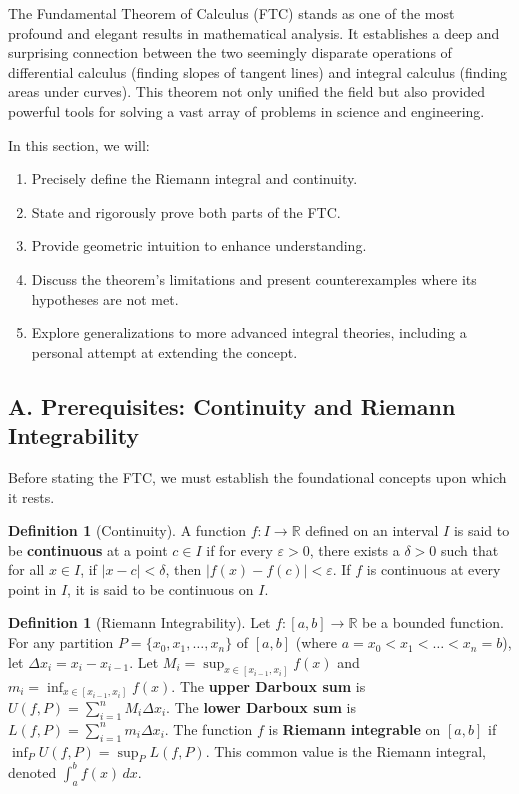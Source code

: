\documentclass[11pt, a4paper]{article}
\theoremstyle{plain} %
\theoremstyle{definition} %
\newtheorem{definition}[theorem]{Definition}
\theoremstyle{remark} %
\begin{document}
The Fundamental Theorem of Calculus (FTC) stands as one of the most profound and elegant results in mathematical analysis. It establishes a deep and surprising connection between the two seemingly disparate operations of differential calculus (finding slopes of tangent lines) and integral calculus (finding areas under curves). This theorem not only unified the field but also provided powerful tools for solving a vast array of problems in science and engineering.

In this section, we will:
\begin{enumerate}
    \item Precisely define the Riemann integral and continuity.
    \item State and rigorously prove both parts of the FTC.
    \item Provide geometric intuition to enhance understanding.
    \item Discuss the theorem's limitations and present counterexamples where its hypotheses are not met.
    \item Explore generalizations to more advanced integral theories, including a personal attempt at extending the concept.
\end{enumerate}

\subsection{A. Prerequisites: Continuity and Riemann Integrability}

Before stating the FTC, we must establish the foundational concepts upon which it rests.

\begin{definition}[Continuity]
    \label{def:continuity}
    A function \( f: I \to \mathbb{R} \) defined on an interval \( I \) is said to be \textbf{continuous} at a point \( c \in I \) if for every \( \varepsilon > 0 \), there exists a \( \delta > 0 \) such that for all \( x \in I \), if \( |x-c| < \delta \), then \( |f(x)-f(c)| < \varepsilon \). If \( f \) is continuous at every point in \( I \), it is said to be continuous on \( I \).
\end{definition}

\begin{definition}[Riemann Integrability]
    \label{def:riemann_integrable}
    Let \( f: [a,b] \to \mathbb{R} \) be a bounded function. For any partition \( P = \{x_0, x_1, \dots, x_n\} \) of \( [a,b] \) (where \( a=x_0 < x_1 < \dots < x_n=b \)), let \( \Delta x_i = x_i - x_{i-1} \).
    Let \( M_i = \sup_{x \in [x_{i-1}, x_i]} f(x) \) and \( m_i = \inf_{x \in [x_{i-1}, x_i]} f(x) \).
    The \textbf{upper Darboux sum} is \( U(f,P) = \sum_{i=1}^n M_i \Delta x_i \).
    The \textbf{lower Darboux sum} is \( L(f,P) = \sum_{i=1}^n m_i \Delta x_i \).
    The function \( f \) is \textbf{Riemann integrable} on \( [a,b] \) if \( \inf_P U(f,P) = \sup_P L(f,P) \). This common value is the Riemann integral, denoted \( \int_a^b f(x) \, dx \).
\end{definition}
\end{document}
